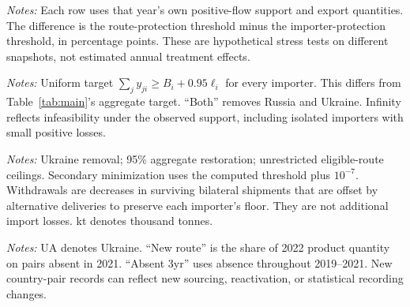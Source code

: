 \documentclass[11pt,a4paper]{article}
\begin{document}
\begin{table}[htbp]\centering\small
\caption{Soybeans: annual Ukraine-removal sensitivity, 95\% aggregate target}\label{tab:years}

\begin{minipage}{\textwidth}\footnotesize\textit{Notes:} Each row uses that year's own positive-flow support and export quantities. The difference is the route-protection threshold minus the importer-protection threshold, in percentage points. These are hypothetical stress tests on different snapshots, not estimated annual treatment effects.\end{minipage}
\end{table}

\begin{table}[htbp]\centering\small
\caption{Requiring 95\% restoration at every affected importer (percent growth)}\label{tab:uniform}

\begin{minipage}{\textwidth}\footnotesize\textit{Notes:} Uniform target $\sum_j y_{ji}\geq B_i+0.95\ell_i$ for every importer. This differs from Table~\ref{tab:main}'s aggregate target. ``Both'' removes Russia and Ukraine. Infinity reflects infeasibility under the observed support, including isolated importers with small positive losses.\end{minipage}
\end{table}

\begin{table}[htbp]\centering\small
\caption{Minimum incumbent withdrawals near the importer-protected threshold}\label{tab:withdrawals}

\begin{minipage}{\textwidth}\footnotesize\textit{Notes:} Ukraine removal; 95\% aggregate restoration; unrestricted eligible-route ceilings. Secondary minimization uses the computed threshold plus $10^{-7}$. Withdrawals are decreases in surviving bilateral shipments that are offset by alternative deliveries to preserve each importer's floor. They are not additional import losses. kt denotes thousand tonnes.\end{minipage}
\end{table}

\begin{table}[htbp]\centering\small
\caption{Observed subsequent-year quantities and support changes}\label{tab:observed}

\begin{minipage}{\textwidth}\footnotesize\textit{Notes:} UA denotes Ukraine. ``New route'' is the share of 2022 product quantity on pairs absent in 2021. ``Absent 3yr'' uses absence throughout 2019--2021. New country-pair records can reflect new sourcing, reactivation, or statistical recording changes.\end{minipage}
\end{table}
\FloatBarrier
\end{document}
